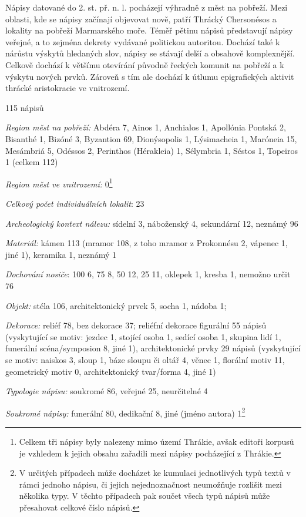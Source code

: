 Nápisy datované do 2. st. př. n. l. pocházejí výhradně z měst na pobřeží. Mezi oblasti, kde se nápisy začínají objevovat nově, patří Thrácký Chersonésos a lokality na pobřeží Marmarského moře. Téměř pětinu nápisů představují nápisy veřejné, a to zejména dekrety vydávané politickou autoritou. Dochází také k nárůstu výskytů hledaných slov, nápisy se stávají delší a obsahově komplexnější. Celkově dochází k většímu otevírání původně řeckých komunit na pobřeží a k výskytu nových prvků. Zároveň s tím ale dochází k útlumu epigrafických aktivit thrácké aristokracie ve vnitrozemí.

\placetable[none]{}
\starttable[|l|]
\HL
{} 115 nápisů

{\em Region měst na pobřeží:} Abdéra 7, Ainos 1, Anchialos 1, Apollónia Pontská 2, Bisanthé 1, Bizóné 3, Byzantion 69, Dionýsopolis 1, Lýsimacheia 1, Maróneia 15, Mesámbriá 5, Odéssos 2, Perinthos (Hérakleia) 1, Sélymbria 1, Séstos 1, Topeiros 1 (celkem 112)

{\em Region měst ve vnitrozemí:} 0\footnote{Celkem tři nápisy byly nalezeny mimo území Thrákie, avšak editoři korpusů je vzhledem k jejich obsahu zařadili mezi nápisy pocházející z Thrákie.}

{\em Celkový počet individuálních lokalit}: 23

{\em Archeologický kontext nálezu:} sídelní 3, náboženský 4, sekundární 12, neznámý 96

{\em Materiál:} kámen 113 (mramor 108, z toho mramor z Prokonnésu 2, vápenec 1, jiné 1), keramika 1, neznámý 1

{\em Dochování nosiče}: 100  6, 75  8, 50  12, 25  11, oklepek 1, kresba 1, nemožno určit 76

{\em Objekt:} stéla 106, architektonický prvek 5, socha 1, nádoba 1;

{\em Dekorace:} reliéf 78, bez dekorace 37; reliéfní dekorace figurální 55 nápisů (vyskytující se motiv: jezdec 1, stojící osoba 1, sedící osoba 1, skupina lidí 1, funerální scéna/symposion 8, jiné 1), architektonické prvky 29 nápisů (vyskytující se motiv: naiskos 3, sloup 1, báze sloupu či oltář 4, věnec 1, florální motiv 11, geometrický motiv 0, architektonický tvar/forma 4, jiné 1)

{\em Typologie nápisu:} soukromé 86, veřejné 25, neurčitelné 4

{\em Soukromé nápisy:} funerální 80, dedikační 8, jiné (jméno autora) 1\footnote{V určitých případech může docházet ke kumulaci jednotlivých typů textů v rámci jednoho nápisu, či jejich nejednoznačnost neumožňuje rozlišit mezi několika typy. V těchto případech pak součet všech typů nápisů může přesahovat celkové číslo nápisů.}

